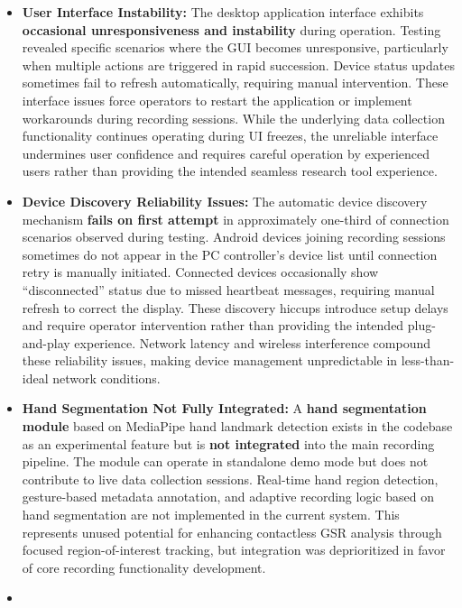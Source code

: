 \documentclass[12pt,a4paper]{article}
\begin{document}
\begin{itemize}
\item
  \textbf{User Interface Instability:} The desktop application interface exhibits \textbf{occasional unresponsiveness and instability} during operation. Testing revealed specific scenarios where the GUI becomes unresponsive, particularly when multiple actions are triggered in rapid succession. Device status updates sometimes fail to refresh automatically, requiring manual intervention. These interface issues force operators to restart the application or implement workarounds during recording sessions. While the underlying data collection functionality continues operating during UI freezes, the unreliable interface undermines user confidence and requires careful operation by experienced users rather than providing the intended seamless research tool experience.
\item
  \textbf{Device Discovery Reliability Issues:} The automatic device discovery mechanism \textbf{fails on first attempt} in approximately one-third of connection scenarios observed during testing. Android devices joining recording sessions sometimes do not appear in the PC controller's device list until connection retry is manually initiated. Connected devices occasionally show ``disconnected'' status due to missed heartbeat messages, requiring manual refresh to correct the display. These discovery hiccups introduce setup delays and require operator intervention rather than providing the intended plug-and-play experience. Network latency and wireless interference compound these reliability issues, making device management unpredictable in less-than-ideal network conditions.
\item
  \textbf{Hand Segmentation Not Fully Integrated:} A \textbf{hand segmentation module} based on MediaPipe hand landmark detection exists in the codebase as an experimental feature but is \textbf{not integrated} into the main recording pipeline. The module can operate in standalone demo mode but does not contribute to live data collection sessions. Real-time hand region detection, gesture-based metadata annotation, and adaptive recording logic based on hand segmentation are not implemented in the current system. This represents unused potential for enhancing contactless GSR analysis through focused region-of-interest tracking, but integration was deprioritized in favor of core recording functionality development.
\item

\end{itemize}
\end{document}
